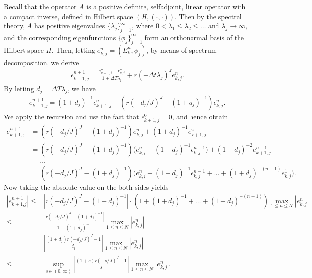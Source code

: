 Recall that the operator $A$ is a positive definite, selfadjoint, linear operator with a compact inverse,
defined in Hilbert space $(H, (\cdot , \cdot ))$. Then by the spectral theory,
$A$ has positive eigenvalues $\{\lambda_j\}_{j=1}^\infty$, where $0<\lambda_1\le \lambda_2 \le \ldots $ and $\lambda_j\rightarrow\infty$,
and the corresponding eigenfunctions $\{\phi_j\}_{j=1}^\infty$ form an orthonormal basis of the Hilbert space $H$.
Then, letting $e_{k,j}^n = (E_{k}^{n}, \phi_j)$, by means of spectrum decomposition,
we derive
\begin{equation*}
\begin{aligned}
    e_{k+1,j}^{n+1} = \frac{e_{k+1,j}^n-e_{k,j}^n}{1+\Delta T \lambda_j} +  r(-\Delta t \lambda_j)^J e_{k,j}^{n}.
\end{aligned}
\end{equation*}
By letting $d_j = \Delta T \lambda_j$, we have
\begin{equation*}
\begin{aligned}
    e_{k+1,j}^{n+1} = (1+d_j)^{-1} e_{k+1,j}^n +  (r(-d_j/J)^J - (1+d_j)^{-1})e_{k,j}^{n}.
\end{aligned}
\end{equation*}
We apply the recursion and use the fact that $ e_{k+1,j}^0=0$, and hence obtain %
\begin{equation*}
\begin{aligned}e_{k+1,j}^{n+1}
&=(r(-d_j/J)^J - (1+d_j)^{-1}) e_{k,j}^n
    + (1+d_j)^{-1} e_{k+1,j}^n\\
&=(r(-d_j/J)^J - (1+d_j)^{-1}) \Big(e_{k,j}^n
    + (1+d_j)^{-1} e_{k,j}^{n-1} \Big)
    +  (1+d_j)^{-2}e_{k+1,j}^{n-1}\\
&\text{{$=\dots$}} \\
&=(r(-d_j/J)^J - (1+d_j)^{-1})
\Big( e_{k,j}^n + (1+d_j)^{-1} e_{k,j}^{n-1} + \dots +
(1+d_j)^{-(n-1)}e_{k,j}^{1}\Big).
 \end{aligned}
\end{equation*}
Now taking the absolute value on the both sides yields
 \begin{equation}\label{eqn:factor-0}
 \begin{aligned}|e_{k+1,j}^{n+1} | \leq &|r(-d_j/J)^J - (1+d_j)^{-1}| \cdot
(1 + (1+d_j)^{-1} + \dots + (1+d_j)^{-(n-1)})
\max_{1\le n\le N}{|e_{k,j}^{n}|} \\
\leq & \frac{|r(-d_j/J)^J -  (1+d_j)^{-1}|}{1-(1+d_j)^{-1}}\max_{1\le n\le N}{|e_{k,j}^{n}|}  \\
=& \left|\frac{(1+d_j) r(-d_j/J)^J-1}{d_j}\right|\max_{1\le n\le N}{|e_{k,j}^{n}|} \\
\le & \sup_{s\in(0,\infty)} \left|\frac{(1+s) r(-s/J)^J-1}{s}\right|\max_{1\le n\le N}{|e_{k,j}^{n}|}.
\end{aligned}
\end{equation}
